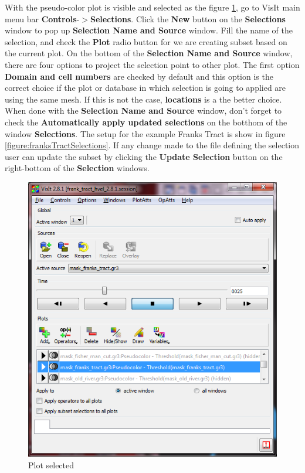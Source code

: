 \documentclass[12pt]{report}
\begin{document}
With the pseudo-color plot is visible and selected as the figure \ref{figure:franksTractColorSelected}, go to VisIt main menu bar 
{\bf Controls}-$>${\bf Selections}. Click the {\bf New} button on the {\bf Selections} window to pop up {\bf Selection Name and Source}
window. Fill the name of the selection, and check the {\bf Plot} radio button for we are creating subset based on the current plot.
On the bottom of the {\bf Selection Name and Source} window, there are four options to project the selection point to other plot.
The first option {\bf Domain and cell numbers} are checked by default and this option is the correct choice if the plot or database in which selection is going to applied are using the same mesh. If this is not the case, {\bf locations} is a the better choice. When done with
the {\bf Selection Name and Source} window, don't forget to check the {\bf Automatically apply updated selections} on the botthom of the window
{\bf Selections}. The setup for the example Franks Tract is show in figure \ref{figure:franksTractSelections}. If any change made to
the file defining the selection user can update the subset by clicking the {\bf Update Selection} button on the right-bottom of the {\bf Selection}
windows.
 


\begin{figure}
\begin{center}
\includegraphics{franksTractColorSelected}
\caption{Plot selected }
\label{figure:franksTractColorSelected}
\end{center}
\end{figure} 	
\end{document}
